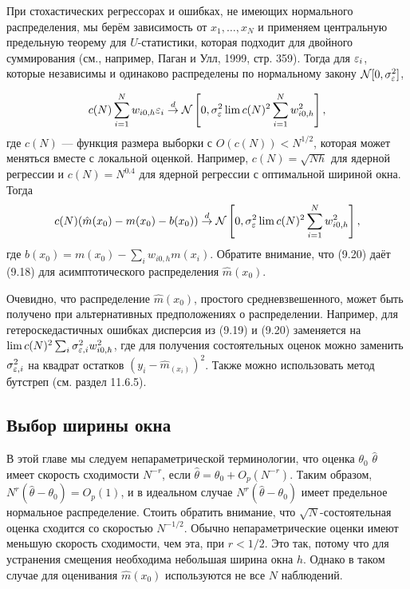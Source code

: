 При стохастических регрессорах и ошибках, не имеющих нормального распределения, мы берём зависимость от $x_1, \dots, x_N$ и применяем центральную предельную теорему для $U$-статистики, которая подходит для двойного суммирования (см., например, Паган и Улл, 1999, стр. 359). Тогда для $\varepsilon_i$, которые независимы и одинаково распределены по нормальному закону $\mathcal{N}[0, \sigma_{\varepsilon}^2]$,

\begin{equation}
c(N)\sum_{i=1}^N w_{i0,h}\varepsilon_i \stackrel{d}{\rightarrow} \mathcal{N}\left[ 0, \sigma_{\varepsilon}^2 \lim c(N)^2 \sum_{i=1}^N w_{i0,h}^2 \right],
\end{equation}
где $c(N)$ --- функция размера выборки с $O(c(N)) < N^{1/2}$, которая может меняться вместе с локальной оценкой. Например, $c(N) = \sqrt{Nh}$ для ядерной регрессии и $c(N) = N^{0.4}$ для ядерной регрессии с оптимальной шириной окна. Тогда
\begin{equation}
c(N)(\hat{m}(x_0) - m(x_0) - b(x_0)) \stackrel{d}{\rightarrow} \mathcal{N}\left[ 0, \sigma_{\varepsilon}^2 \lim c(N)^2 \sum_{i=1}^N w_{i0,h}^2 \right],
\end{equation}
где $b(x_0) = m(x_0) - \sum_i w_{i0,h} m(x_i)$. Обратите внимание, что (9.20) даёт (9.18) для асимптотического распределения $\hat{m}(x_0)$. 

Очевидно, что распределение $\hat{m}(x_0)$, простого средневзвешенного, может быть получено при альтернативных предположениях о распределении. Например, для гетероскедастичных ошибках дисперсия из (9.19) и (9.20) заменяется на $\lim c(N)^2 \sum_i \sigma_{\varepsilon,i}^2 w_{i0,h}^2$, где для получения состоятельных оценок можно заменить $\sigma_{\varepsilon,i}^2$ на квадрат остатков $(y_i - \hat{m}_(x_i))^2$. Также можно использовать метод бутстреп (см. раздел 11.6.5).

\subsection{Выбор ширины окна}

В этой главе мы следуем непараметрической терминологии, что оценка $\theta_0$ $\hat{\theta}$ имеет скорость сходимости $N^{-r}$, если $\hat{\theta} = \theta_0 + O_p(N^{-r})$. Таким образом, $N^r (\hat{\theta} - \theta_0) = O_p(1)$, и в идеальном случае $N^r (\hat{\theta} - \theta_0)$ имеет предельное нормальное распределение. Стоить обратить внимание, что $\sqrt{N}$-состоятельная оценка сходится со скоростью $N^{-1/2}$. Обычно непараметрические оценки имеют меньшую скорость сходимости, чем эта, при $r < 1/2$. Это так, потому что для устранения смещения необходима небольшая ширина окна $h$. Однако в таком случае для оценивания $\hat{m}(x_0)$ используются не все $N$ наблюдений.


